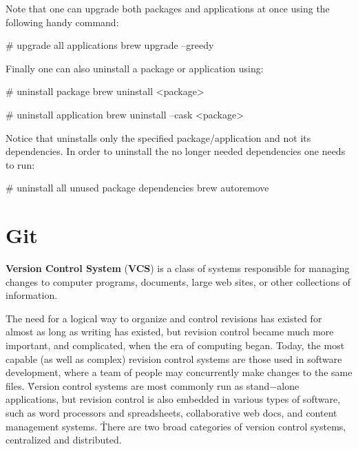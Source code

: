 Note that one can upgrade both packages and applications at once using the following handy command:

\begin{bash}
# upgrade all applications
brew upgrade --greedy
\end{bash}

Finally one can also uninstall a package or application using:

\begin{bash}
# uninstall package
brew uninstall <package>
\end{bash}

\begin{bash}
# uninstall application
brew uninstall --cask <package>
\end{bash}

Notice that  uninstalls only the specified package/application and not its dependencies. In
order to uninstall the no longer needed dependencies one needs to run:

\begin{bash}
# uninstall all unused package dependencies
brew autoremove
\end{bash}

\section{Git}


\textbf{Version Control System} (\textbf{VCS}) is a class of systems responsible for managing changes to computer
programs, documents, large web sites, or other collections of information.
\ed

The need for a logical way to organize and control revisions has existed for almost as long as writing has existed,
but revision control became much more important, and complicated, when the era of computing began. Today, the most
capable (as well as complex) revision control systems are those used in software development, where a team of people
may concurrently make changes to the same files. \v

Version control systems are most commonly run as stand$-$alone applications, but revision control is also embedded in
various types of software, such as word processors and spreadsheets, collaborative web docs, and content management
systems. \v

There are two broad categories of version control systems, centralized and distributed.

